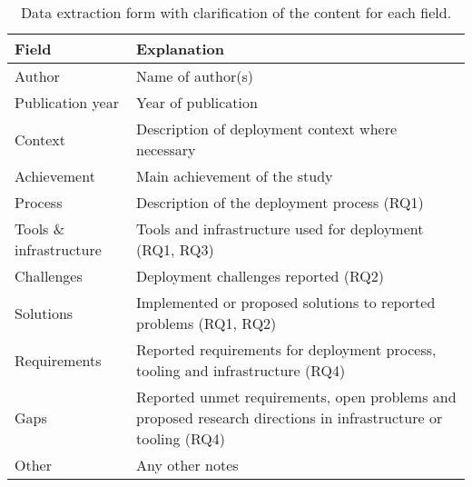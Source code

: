 
\begin{table}[]
    \centering
    \begin{tabular}{l|p{8.5cm}}
        Field & Explanation\\
        \hline
        Author & Name of author(s)  \\
        Publication year & Year of publication \\
        Context & Description of deployment context where necessary \\
        Achievement & Main achievement of the study \\
        Process & Description of the deployment process (RQ1) \\
        Tools \& infrastructure & Tools and infrastructure used for deployment (RQ1, RQ3) \\
        Challenges & Deployment challenges reported (RQ2) \\
        Solutions & Implemented or proposed solutions to reported problems (RQ1, RQ2) \\
        Requirements & Reported requirements for deployment process, tooling and infrastructure (RQ4) \\
        Gaps & Reported unmet requirements, open problems and proposed research directions in infrastructure or tooling  (RQ4) \\
        Other & Any other notes \\
    \end{tabular}
    \caption{Data extraction form with clarification of the content for each field.}
    \label{tab:data_extraction_form}
\end{table}


